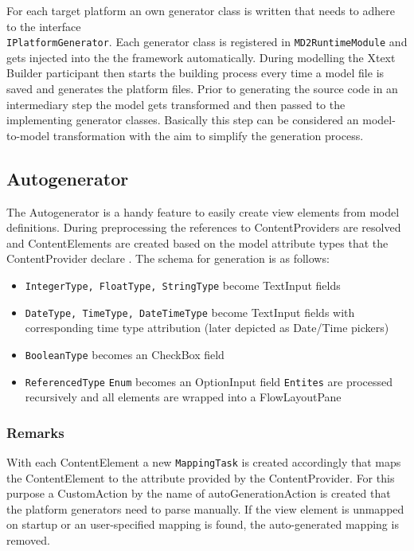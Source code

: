 

For each target platform an own generator class is written that needs to adhere to the interface \\ \lstinline|IPlatformGenerator|. Each generator class is registered in  \lstinline|MD2RuntimeModule| and gets injected into the the framework automatically. During modelling the Xtext Builder participant then starts the building process every time a model file is saved and generates the platform files.
Prior to generating the source code in an intermediary step the model gets transformed and then passed to the implementing generator classes. Basically this step can be considered an model-to-model transformation with the aim to simplify the generation process.
\subsection{Autogenerator}
The Autogenerator is a handy feature to easily create view elements from model definitions. During preprocessing the references to ContentProviders are resolved and ContentElements are created based on the model attribute types that the ContentProvider declare . The schema for generation is as follows:

\begin{itemize}
	\item \lstinline!IntegerType, FloatType, StringType! become TextInput fields
	\item \lstinline!DateType, TimeType, DateTimeType! become TextInput fields with corresponding time type attribution (later depicted as Date/Time pickers)
	\item \lstinline!BooleanType! becomes an CheckBox field
	\item \lstinline!ReferencedType!
		\subitem \lstinline!Enum! becomes an OptionInput field
		\subitem \lstinline!Entites! are processed recursively and all elements are wrapped into a FlowLayoutPane
\end{itemize}

\subsubsection{Remarks}
With each ContentElement a new \lstinline!MappingTask! is created accordingly that maps the ContentElement to the attribute provided by the ContentProvider. For this purpose a CustomAction by the name of autoGenerationAction is created that the platform generators need to parse manually. If the view element is unmapped on startup or an user-specified mapping is found, the auto-generated mapping is removed.

